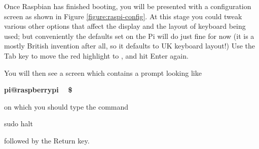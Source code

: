 Once Raspbian has finished booting, you will
be presented with a configuration screen as shown in Figure \ref{figure:raspi-config}.
At this stage you could tweak various other options that affect the
display and the layout of keyboard being used; but conveniently the
defaults set on the Pi will do just fine for now (it is a mostly
British invention after all, so it defaults to UK keyboard layout!)
Use the Tab key to move the red highlight to , and hit
Enter again.






You will then see a screen which contains a prompt looking like

\begin{ttoutenv}
\textbf{pi@raspberrypi ~ \$  }
\end{ttoutenv}
on which you should type the command

\begin{ttoutenv}
sudo halt
\end{ttoutenv}
followed by the Return key.

